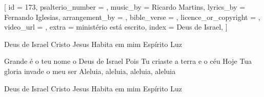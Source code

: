 
[
    id                     = {173},
    psalterio_number       = {},
    music_by               = {Ricardo Martins},
    lyrics_by              = {Fernando Iglesias},
    arrangement_by         = {},
    bible_verse            = {},
    licence_or_copyright   = {},
    video_url              = {},
    extra                  = {ministério está escrito},
    index                  = {Deus de Israel},
]


\beginverse
Deus de Israel
Cristo Jesus
Habita em mim
Espírito Luz
\endverse

\beginverse
Grande é o teu nome o Deus de Israel
Pois Tu criaste a terra e o céu
Hoje Tua gloria invade o meu ser
Aleluia, aleluia, aleluia, aleluia
\endverse

\beginverse
Deus de Israel
Cristo Jesus
Habita em mim
Espírito Luz
\endverse


\endsong
